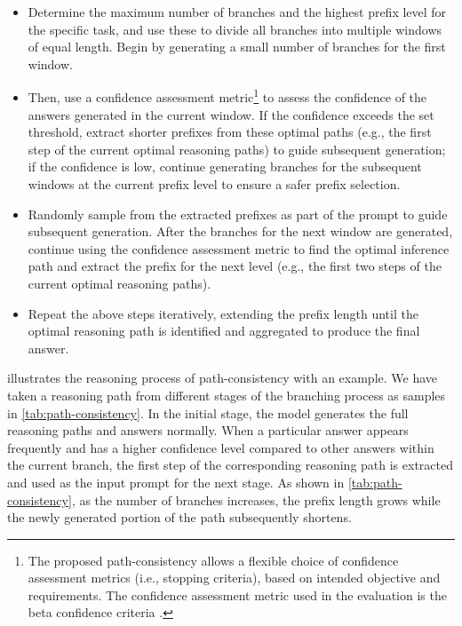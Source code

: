 \begin{itemize}[noitemsep, topsep=0pt, partopsep=0pt]
\item Determine the maximum number of branches and the highest prefix level for the specific task, and use these to divide all branches into multiple windows of equal length. Begin by generating a small number of branches for the first window. 
\item Then, use a confidence assessment metric\footnote{The proposed path-consistency allows a flexible choice of confidence assessment metrics (i.e., stopping criteria), based on intended objective and requirements. The confidence assessment metric used in the evaluation is the beta confidence criteria \cite{aggarwal2023let}.} to assess the confidence of the answers generated in the current window. If the confidence exceeds the set threshold, extract shorter prefixes from these optimal paths (e.g., the first step of the current optimal reasoning paths) to guide subsequent generation; if the confidence is low, continue generating branches for the subsequent windows at the current prefix level to ensure a safer prefix selection.
\item Randomly sample from the extracted prefixes as part of the prompt to guide subsequent generation. After the branches for the next window are generated, continue using the confidence assessment metric to find the optimal inference path and extract the prefix for the next level (e.g., the first two steps of the current optimal reasoning paths).
\item Repeat the above steps iteratively, extending the prefix length until the optimal reasoning path is identified and aggregated to produce the final answer.
\end{itemize}

 illustrates the reasoning process of path-consistency with an example. We have taken a reasoning path from different stages of the branching process as samples in \cref{tab:path-consistency}. In the initial stage, the model generates the full reasoning paths and answers normally. When a particular answer appears frequently and has a higher confidence level compared to other answers within the current branch, the first step of the corresponding reasoning path is extracted and used as the input prompt for the next stage. As shown in \cref{tab:path-consistency}, as the number of branches increases, the prefix length grows while the newly generated portion of the path subsequently shortens.

